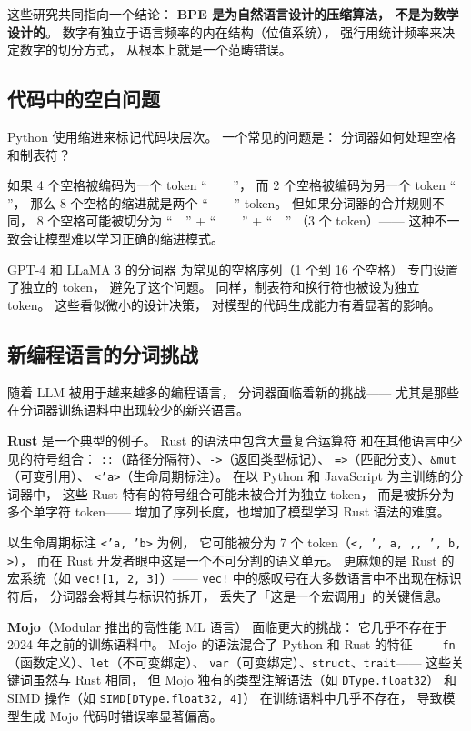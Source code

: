 这些研究共同指向一个结论：
\textbf{BPE 是为自然语言设计的压缩算法，
不是为数学设计的}。
数字有独立于语言频率的内在结构（位值系统），
强行用统计频率来决定数字的切分方式，
从根本上就是一个范畴错误。

\subsection{代码中的空白问题}

Python 使用缩进来标记代码块层次。
一个常见的问题是：
分词器如何处理空格和制表符？

如果 4 个空格被编码为一个 token ``\verb|    |''，
而 2 个空格被编码为另一个 token ``\verb|  |''，
那么 8 个空格的缩进就是两个
``\verb|    |'' token。
但如果分词器的合并规则不同，
8 个空格可能被切分为
``\verb|  |'' + ``\verb|    |'' + ``\verb|  |''
（3 个 token）——
这种不一致会让模型难以学习正确的缩进模式。

GPT-4 和 LLaMA 3 的分词器
为常见的空格序列（1 个到 16 个空格）
专门设置了独立的 token，
避免了这个问题。
同样，制表符和换行符也被设为独立 token。
这些看似微小的设计决策，
对模型的代码生成能力有着显著的影响。

\subsection{新编程语言的分词挑战}

随着 LLM 被用于越来越多的编程语言，
分词器面临着新的挑战——
尤其是那些在分词器训练语料中出现较少的新兴语言。

\textbf{Rust} 是一个典型的例子。
Rust 的语法中包含大量复合运算符
和在其他语言中少见的符号组合：
\texttt{::}（路径分隔符）、\texttt{->}（返回类型标记）、
\texttt{=>}（匹配分支）、\texttt{\&mut}（可变引用）、
\texttt{<'a>}（生命周期标注）。
在以 Python 和 JavaScript 为主训练的分词器中，
这些 Rust 特有的符号组合可能未被合并为独立 token，
而是被拆分为多个单字符 token——
增加了序列长度，也增加了模型学习 Rust 语法的难度。

以生命周期标注 \texttt{<'a, 'b>} 为例，
它可能被分为 7 个 token（\texttt{<, ', a, ,, ', b, >}），
而在 Rust 开发者眼中这是一个不可分割的语义单元。
更麻烦的是 Rust 的宏系统（如 \texttt{vec![1, 2, 3]}）——
\texttt{vec!} 中的感叹号在大多数语言中不出现在标识符后，
分词器会将其与标识符拆开，
丢失了「这是一个宏调用」的关键信息。

\textbf{Mojo}（Modular 推出的高性能 ML 语言）
面临更大的挑战：
它几乎不存在于 2024 年之前的训练语料中。
Mojo 的语法混合了 Python 和 Rust 的特征——
\texttt{fn}（函数定义）、\texttt{let}（不可变绑定）、
\texttt{var}（可变绑定）、\texttt{struct}、\texttt{trait}——
这些关键词虽然与 Rust 相同，
但 Mojo 独有的类型注解语法（如 \texttt{DType.float32}）
和 SIMD 操作（如 \texttt{SIMD[DType.float32, 4]}）
在训练语料中几乎不存在，
导致模型生成 Mojo 代码时错误率显著偏高。

